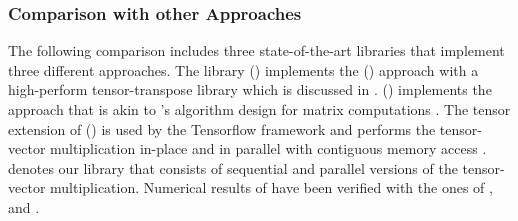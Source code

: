 \begin{comment}
Applying the first setup configuration with asymmetrically-shaped tensors, we have analyzed the effects of the blocking and parallelization strategy.
The \tf{LB}-\tf{PN} version processes tensors with different storage formats, namely the $1$-, $2$-, $9$- and $10$-order layout.
The performance behavior is almost the same for all storage formats except for the corner cases $q = \pi_1$ and $q = \pi_p$.
Even the performance drop for $q = p-1$ is almost unchanged.
The standard deviation from the mean value is less than $10$\% for all storage formats.
Given a contraction mode $q = \pi_k$ with $1 < k < p$, a permutation of the inner and outer tensor dimensions with their respective indices $\pi_1, \dots,  \pi_{k-1}$ and $\pi_{k+1}, \dots, \pi_{p}$ does influence the runtime where the \tf{LB}-\tf{PN} version calls \tf{GEMV} with the values $w_m$ and $n_m$.
The same holds true for the outer layout tuple.
\end{comment}


\subsubsection{Comparison with other Approaches}
The following comparison includes three state-of-the-art libraries that implement three different approaches.
The library  () implements the () approach with a high-perform tensor-transpose library  which is discussed in \cite{springer:2018:design}.
 () implements the  approach that is akin to 's algorithm design for matrix computations \cite{matthews:2018:high}.
The tensor extension of  () is used by the Tensorflow framework and performs the tensor-vector multiplication in-place and in parallel with contiguous memory access \cite{abadi:2016:tensorflow}.
 denotes our library that consists of sequential and parallel versions of the tensor-vector multiplication.
Numerical results of  have been verified with the ones of ,  and .

